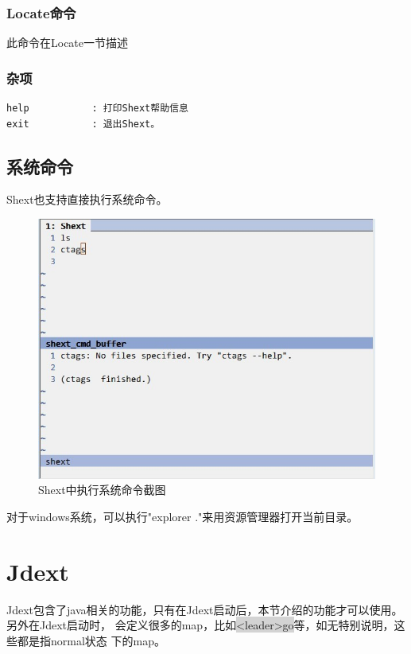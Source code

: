 \documentclass[oneside,openany]{book}
\begin{document}
\subsubsection{Locate命令}
此命令在Locate一节描述

\subsubsection{杂项}
\begin{verbatim}
help           : 打印Shext帮助信息
exit           : 退出Shext。
\end{verbatim}

\subsection{系统命令}
  Shext也支持直接执行系统命令。
  \FloatBarrier
  \begin{figure}[H]%
  \centering
  \includegraphics[scale=0.5]{shext-syscmd.jpg}
  \caption{Shext中执行系统命令截图}
  \end{figure}

  对于windows系统，可以执行"explorer ."来用资源管理器打开当前目录。

\section{Jdext}
  Jdext包含了java相关的功能，只有在Jdext启动后，本节介绍的功能才可以使用。另外在Jdext启动时，
会定义很多的map，比如\colorbox{lightgray}{<leader>go}等，如无特别说明，这些都是指normal状态
下的map。
\end{document}
